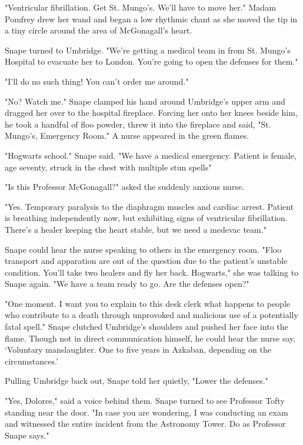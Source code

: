 "Ventricular fibrillation. Get St. Mungo's. We'll have to move her." Madam Pomfrey drew her wand and began a low rhythmic chant as she moved the tip in a tiny circle around the area of McGonagall's heart.

Snape turned to Umbridge. "We're getting a medical team in from St. Mungo's Hospital to evacuate her to London. You're going to open the defenses for them."

"I'll do no such thing! You can't order me around."

"No? Watch me." Snape clamped his hand around Umbridge's upper arm and dragged her over to the hospital fireplace. Forcing her onto her knees beside him, he took a handful of floo powder, threw it into the fireplace and said, "St. Mungo's, Emergency Room." A nurse appeared in the green flames.

"Hogwarts school." Snape said. "We have a medical emergency. Patient is female, age seventy, struck in the chest with multiple stun spells{\el}"

"Is this Professor McGonagall?" asked the suddenly anxious nurse.

"Yes. Temporary paralysis to the diaphragm muscles and cardiac arrest. Patient is breathing independently now, but exhibiting signs of ventricular fibrillation. There's a healer keeping the heart stable, but we need a medevac team."

Snape could hear the nurse speaking to others in the emergency room. "Floo transport and apparation are out of the question due to the patient's unstable condition. You'll take two healers and fly her back. Hogwarts," she was talking to Snape again. "We have a team ready to go. Are the defenses open?"

"One moment. I want you to explain to this desk clerk what happens to people who contribute to a death through unprovoked and malicious use of a potentially fatal spell." Snape clutched Umbridge's shoulders and pushed her face into the flame. Though not in direct communication himself, he could hear the nurse say, `Voluntary manslaughter. One to five years in Azkaban, depending on the circumstances.'

Pulling Umbridge back out, Snape told her quietly, "Lower the defenses."

"Yes, Dolores," said a voice behind them. Snape turned to see Professor Tofty standing near the door. "In case you are wondering, I was conducting an exam and witnessed the entire incident from the Astronomy Tower. Do as Professor Snape says."


